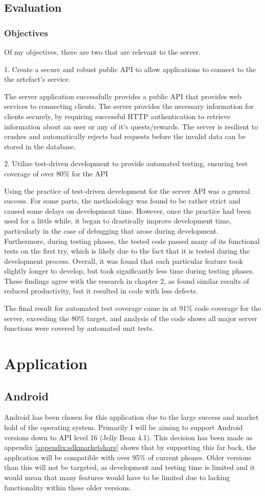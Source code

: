 \subsection{Evaluation}
\subsubsection{Objectives}
Of my objectives, there are two that are relevant to the server.

1. Create a secure and robust public API to allow applications to connect to the the artefact's service.

The server application successfully provides a public API that provides web services to connecting clients.
The server provides the necessary information for clients securely, by requiring successful HTTP authentication to retrieve information about an user or any of it's quests/rewards.
The server is resilient to crashes and automatically rejects bad requests before the invalid data can be stored in the database.

2. Utilize test-driven development to provide automated testing, ensuring test coverage of over 80\% for the API

Using the practice of test-driven development for the server API was a general success. 
For some parts, the methodology was found to be rather strict and caused some delays on development time.
However, once the practice had been used for a little while, it began to drastically improve development time, particularly in the case of debugging that arose during development.
Furthermore, during testing phases, the tested code passed many of its functional tests on the first try, which is likely due to the fact that it is tested during the development process.
Overall, it was found that each particular feature took slightly longer to develop, but took significantly less time during testing phases.
These findings agree with the research in chapter 2, as \cite{IBMTDD} found similar results of reduced productivity, but it resulted in code with less defects.

The final result for automated test coverage came in at 91\% code coverage for the server, exceeding the 80\% target, and analysis of the code shows all major server functions were covered by automated unit tests.

\section{Application}
\subsection{Android}
Android has been chosen for this application due to the large success and market hold of the operating system.
Primarily I will be aiming to support Android versions down to API level 16 (Jelly Bean 4.1).
This decision has been made as appendix \ref{appendix:sdkmarketshare} shows that by supporting this far back, the application will be compatible with over 95\% of current phones. 
Older versions than this will not be targeted, as development and testing time is limited and it would mean that many features would have to be limited due to lacking functionality within these older versions.

